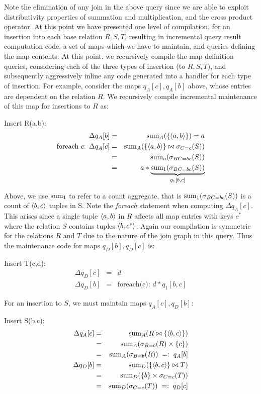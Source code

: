 Note the elimination of any join in the above query since we are able to exploit
distributivity properties of summation and multiplication, and the cross product
operator. At this point we have presented one level of compilation, for an
insertion into each base relation $R, S, T$, resulting in incremental query
result computation code, a set of maps which we have to maintain, and queries
defining the map contents. At this point, we recursively compile the map
definition queries, considering each of the three types of insertion (to
$R,S,T$), and subsequently aggressively inline any code generated into a handler
for each type of insertion. For example, consider the maps $q_A[c], q_A[b]$
above, whose entries are dependent on the relation $R$. We recursively compile
incremental maintenance of this map for insertions to $R$ as:

\smallskip
Insert R(a,b):
\begin{eqnarray*}
\Delta q_A[b] &=& \mathrm{sum}_{A}(\{{\langle a,b\rangle}\}) = a
\\
\mbox{foreach $c$: }
\Delta q_A[c] &=& \mathrm{sum}_{A}(\{{\langle a,b\rangle}\} \bowtie \sigma_{C=c}(S))
\\ &=&
\mathrm{sum}_{a}(\sigma_{BC=bc}(S))
\\ &=&
a * \underbrace{\mathrm{sum}_{1}(\sigma_{BC=bc}(S))}_{q_1[b,c]}
\end{eqnarray*}

Above, we use $\mathrm{sum}_{1}$ to refer to a count aggregate, that is 
$\mathrm{sum}_{1}(\sigma_{BC=bc}(S))$ is a count of ${\langle b,c\rangle}$ tuples in S.
Note the \textit{foreach} statement when computing $\Delta q_A[c]$. This arises
since a single tuple ${\langle a,b\rangle}$ in $R$ affects all map entries with keys
$c^*$ where the relation $S$ contains tuples ${\langle b,c^*\rangle}$. Again our
compilation is symmetric for the relations $R$ and $T$ due to the nature of the
join graph in this query. Thus the maintenance code for maps $q_D[b], q_D[c]$
is:

\smallskip
Insert T(c,d):
\begin{eqnarray*}
\Delta q_D[c] &=& d\\
\Delta q_D[b] &=& \mbox{foreach(c): } d * q_1[b,c]
\end{eqnarray*}

\noindent For an insertion to $S$, we must maintain maps $q_A[c], q_D[b]$:

\smallskip
Insert S(b,c):
\begin{eqnarray*}
\Delta q_A[c] &=&
\mathrm{sum}_{A}(R \bowtie \{{\langle b,c\rangle}\})
\\ &=&
\mathrm{sum}_{A}(\sigma_{B=b}(R) \times \{c\})
\\ &=&
\mathrm{sum}_{A}(\sigma_{B=b}(R))
\;=:\; q_A[b]
\\
\Delta q_D[b] &=&
\mathrm{sum}_{D}(\{{\langle b,c\rangle}\} \bowtie T)
\\ &=&
\mathrm{sum}_{D}(\{b\} \times \sigma_{C=c}(T))
\\ &=&
\mathrm{sum}_{D}(\sigma_{C=c}(T))
\;=:\; q_D[c]
\end{eqnarray*}


